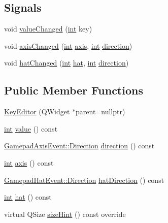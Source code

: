 \subsection*{Signals}
\begin{DoxyCompactItemize}
\item 
void \mbox{\hyperlink{class_q_g_b_a_1_1_key_editor_a060ef43bb32ff534083db12143ffad02}{value\+Changed}} (\mbox{\hyperlink{ioapi_8h_a787fa3cf048117ba7123753c1e74fcd6}{int}} key)
\item 
void \mbox{\hyperlink{class_q_g_b_a_1_1_key_editor_a3fb5151c9ce4c79fb6cec76021bb13ab}{axis\+Changed}} (\mbox{\hyperlink{ioapi_8h_a787fa3cf048117ba7123753c1e74fcd6}{int}} \mbox{\hyperlink{class_q_g_b_a_1_1_key_editor_aed1e594b4662a661a9b5d111c9fa5ab9}{axis}}, \mbox{\hyperlink{ioapi_8h_a787fa3cf048117ba7123753c1e74fcd6}{int}} \mbox{\hyperlink{class_q_g_b_a_1_1_key_editor_ad25269e1dcdc079722604aa156cece1b}{direction}})
\item 
void \mbox{\hyperlink{class_q_g_b_a_1_1_key_editor_a1fe06073809c20b103d4a670343ecde1}{hat\+Changed}} (\mbox{\hyperlink{ioapi_8h_a787fa3cf048117ba7123753c1e74fcd6}{int}} \mbox{\hyperlink{class_q_g_b_a_1_1_key_editor_a13aee5f3cf3a557a96334eda9b44b6d0}{hat}}, \mbox{\hyperlink{ioapi_8h_a787fa3cf048117ba7123753c1e74fcd6}{int}} \mbox{\hyperlink{class_q_g_b_a_1_1_key_editor_ad25269e1dcdc079722604aa156cece1b}{direction}})
\end{DoxyCompactItemize}
\subsection*{Public Member Functions}
\begin{DoxyCompactItemize}
\item 
\mbox{\hyperlink{class_q_g_b_a_1_1_key_editor_afb73c3665702a0e2fbf33371aacfbc26}{Key\+Editor}} (Q\+Widget $\ast$parent=nullptr)
\item 
\mbox{\hyperlink{ioapi_8h_a787fa3cf048117ba7123753c1e74fcd6}{int}} \mbox{\hyperlink{class_q_g_b_a_1_1_key_editor_a6065db62f1781bf111e5133e2f0948ce}{value}} () const
\item 
\mbox{\hyperlink{class_q_g_b_a_1_1_gamepad_axis_event_a5d50ab74dce4e58252f2affb5f227bbc}{Gamepad\+Axis\+Event\+::\+Direction}} \mbox{\hyperlink{class_q_g_b_a_1_1_key_editor_ad25269e1dcdc079722604aa156cece1b}{direction}} () const
\item 
\mbox{\hyperlink{ioapi_8h_a787fa3cf048117ba7123753c1e74fcd6}{int}} \mbox{\hyperlink{class_q_g_b_a_1_1_key_editor_aed1e594b4662a661a9b5d111c9fa5ab9}{axis}} () const
\item 
\mbox{\hyperlink{class_q_g_b_a_1_1_gamepad_hat_event_ae3f20662c61b054e5344aafb9d843837}{Gamepad\+Hat\+Event\+::\+Direction}} \mbox{\hyperlink{class_q_g_b_a_1_1_key_editor_a16ba1d9604e684e86b4e5ef6c8a00599}{hat\+Direction}} () const
\item 
\mbox{\hyperlink{ioapi_8h_a787fa3cf048117ba7123753c1e74fcd6}{int}} \mbox{\hyperlink{class_q_g_b_a_1_1_key_editor_a13aee5f3cf3a557a96334eda9b44b6d0}{hat}} () const
\item 
virtual Q\+Size \mbox{\hyperlink{class_q_g_b_a_1_1_key_editor_aa762a31f045fb0982f5a897927b79814}{size\+Hint}} () const override
\end{DoxyCompactItemize}
